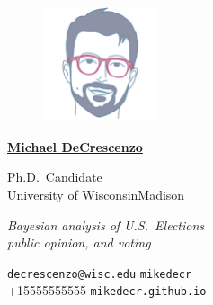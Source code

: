 \documentclass[10pt, oneside, final]{article}
\begin{document}
  \thispagestyle{empty}
  
  \begin{figure}
  \includegraphics[width = 0.3\textwidth]{img/circular-telles.png}
  \end{figure}

  \underline{\large\textsf{\textbf{Michael DeCrescenzo}}}

  {Ph.D.\ Candidate} \\
  {University of Wisconsin{\textendash}Madison}

  \emph{Bayesian analysis of U.S.\ Elections \\ public opinion, and voting}

  \vfill 
  {\faEnvelope} \texttt{decrescenzo@wisc.edu} \hfill 
  {\faGithub} \texttt{mikedecr} \\
  {\faPhone} +1{\textendash}555{\textendash}555{\textendash}5555 \hfill 
  {\faGlobe} \texttt{mikedecr.github.io}
  
\end{document}
